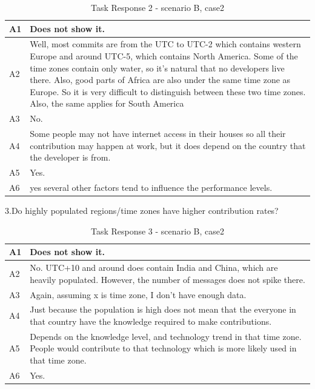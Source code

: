 \documentclass[double,12pt]{beavtex}
\begin{document}
\begin{appendices}
\begin{table}[H]
\begin{tabular}{ |p{2cm}|p{12cm}| }
 \hline
 A1 & Does not show it.\\
 \hline
 A2 & Well, most commits are from the UTC to UTC-2 which contains western Europe and around UTC-5, which contains North America. Some of the time zones contain only water, so it's natural that no developers live there. Also, good parts of Africa are also under the same time zone as Europe. So it is very difficult to distinguish between these two time zones. Also, the same applies for South America\\ \hline
 A3 & No.\\ \hline
 A4 & Some people may not have internet access in their houses so all their contribution may happen at work, but it does depend on the country that the developer is from.\\ \hline
 A5 & Yes.\\ \hline
 A6 & yes several other factors tend to influence the performance levels.\\
 \hline
\end{tabular}
\caption{Task Response 2 - scenario B, case2}
\label{tab:table32}
\end{table}

3.Do highly populated regions/time zones have higher contribution rates?	

\begin{table}[H]
\begin{tabular}{ |p{2cm}|p{12cm}| }
 \hline
 A1 & Does not show it.\\ \hline
 A2 & No. UTC+10 and around does contain India and China, which are heavily populated. However, the number of messages does not spike there.\\ \hline
 A3 & Again, assuming x is time zone, I don't have enough data.\\ \hline
 A4 & Just because the population is high does not mean that the everyone in that country have the knowledge required to make contributions.\\ \hline
 A5 & Depends on the knowledge level, and technology trend in that time zone. People would contribute to that technology which is more likely used in that time zone.\\ \hline
 A6 & Yes.\\
 \hline
\end{tabular}
\caption{Task Response 3 - scenario B, case2}
\label{tab:table33}
\end{table}


\end{appendices}
\end{document}
